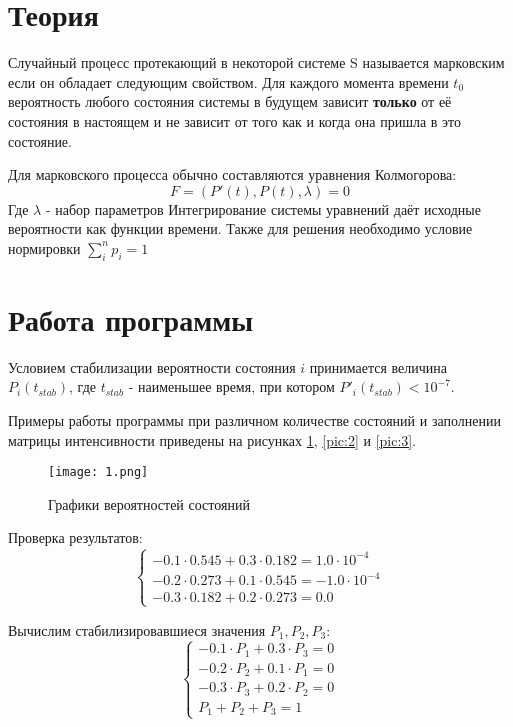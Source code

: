 \section{Теория}
	Случайный процесс протекающий в некоторой системе S называется марковским если он обладает следующим свойством. Для каждого момента времени $t_0$ вероятность любого состояния системы в будущем зависит \textbf{только} от её состояния в настоящем и не зависит от того как и когда она пришла в это состояние.
	
	Для марковского процесса обычно составляются уравнения Колмогорова: 
	\begin{equation*}
		F = (P'(t), P(t), \lambda) = 0
	\end{equation*}
	Где $\lambda$ - набор параметров 
	Интегрирование системы уравнений даёт исходные вероятности как функции времени. Также для решения необходимо условие нормировки $\sum_{i}^{n}{p_i} = 1$ 

\section{Работа программы}
	Условием стабилизации вероятности состояния $i$ принимается величина $P_i(t_{stab})$, где $t_{stab}$ - наименьшее время, при котором ${P'}_i(t_{stab}) < 10^{-7}$. 
	
	Примеры работы программы при различном количестве состояний и заполнении матрицы интенсивности приведены на рисунках \ref{pic:1}, \ref{pic:2} и \ref{pic:3}.
	
	\newpage
	\begin{figure}[h]
		\begin{center}
			{\texttt{[image: 1.png]}
			\caption{Графики вероятностей состояний}
			\label{pic:1}}
		\end{center}
	\end{figure}
	
	Проверка результатов:
	\begin{equation}
		\left\{\begin{array}{l}
			-0.1 \cdot 0.545 + 0.3\cdot0.182 = 1.0\cdot10^{-4} \\
			-0.2 \cdot 0.273 + 0.1\cdot0.545 = -1.0\cdot10^{-4} \\
			-0.3 \cdot 0.182 + 0.2\cdot0.273 = 0.0
		\end{array}\right.
	\end{equation}
	
	Вычислим стабилизировавшиеся значения $P_1, P_2, P_3$:
	\begin{equation*}
		\left\{\begin{array}{l}
			-0.1 \cdot P_1 + 0.3 \cdot P_3 = 0 \\
			-0.2 \cdot P_2 + 0.1 \cdot P_1 = 0 \\
			-0.3 \cdot P_3 + 0.2 \cdot P_2 = 0 \\
			P_1 + P_2 + P_3 = 1
		\end{array}\right.
	\end{equation*}

